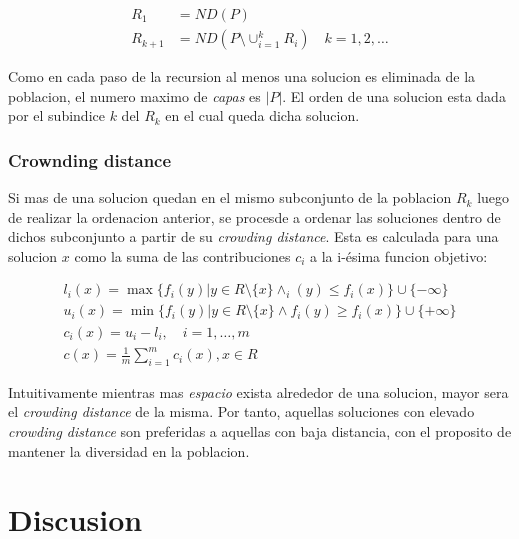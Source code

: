 \begin{align}
    R_1 &= ND(P) \\
    R_{k+1} &= ND(P \setminus \cup_{i=1}^k R_i) \quad k = 1,2, \dots
\end{align}

Como en cada paso de la recursion al menos una solucion es eliminada de la poblacion, el numero maximo de \emph{capas} es $|P|$. El orden de una solucion esta dada por el subindice $k$ del $R_k$ en el cual queda dicha solucion.

\subsubsection{Crownding distance}\label{section:crowding-distance}

Si mas de una solucion quedan en el mismo subconjunto de la poblacion $R_k$ luego de realizar la ordenacion anterior, se procesde a ordenar las soluciones dentro de dichos subconjunto a partir de su \emph{crowding distance}. Esta es calculada para una solucion $x$ como la suma de las contribuciones $c_i$ a la i-\'esima funcion objetivo:

\begin{align}
    l_i(x) = \max \{ f_i(y) | y \in R \setminus \{x\} \wedge_i(y) \leq f_i(x) \} \cup \{-\infty\} \\
    u_i(x) = \min \{ f_i(y) | y \in R \setminus \{x\} \wedge f_i(y) \geq f_i(x) \} \cup \{+\infty\} \\
    c_i(x) = u_i - l_i, \quad i = 1, \dots, m \\
    c(x)   = \frac{1}{m} \sum_{i=1}^m c_i(x), x \in R
\end{align}

Intuitivamente mientras mas \textit{espacio} exista alrededor de una solucion, mayor sera el \emph{crowding distance} de la misma. Por tanto, aquellas soluciones con elevado \emph{crowding distance} son preferidas a aquellas con baja distancia, con el proposito de mantener la diversidad en la poblacion.

\section{Discusion}\label{discussion}
